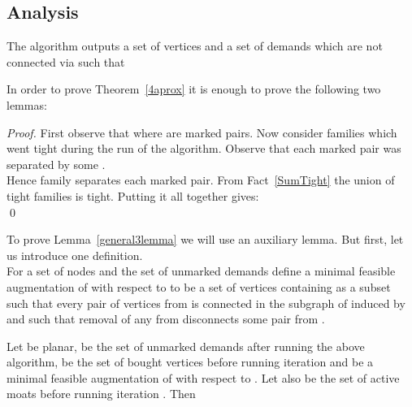 \subsection{Analysis}
\begin{theorem}
\label{4aprox}
The algorithm outputs a set of vertices  and a set of demands  which are not connected via  such that

\end{theorem}
In order to prove Theorem~\ref{4aprox} it is enough to prove the following two lemmas:
\begin{lemma}
\label{pc1lemma}

\end{lemma}
\begin{proof}
First observe that  where  are marked pairs. Now consider families  which went tight during the run of the algorithm. Observe that each marked pair was separated by some .\\
Hence family  separates each marked pair.
From Fact~\ref{SumTight} the union of tight families is tight. Putting it all together gives:\\
 \qed
\end{proof}

\begin{lemma}
\label{general3lemma}

\end{lemma}
To prove Lemma~\ref{general3lemma} we will use an auxiliary lemma. But first, let us introduce one definition.\\
For a set of nodes  and the set of unmarked demands  define a minimal feasible augmentation  of  with respect to  to be a set of vertices  containing  as a subset such that every pair of vertices from  is connected in the subgraph of  induced by  and such that removal of any  from  disconnects some pair from .

\begin{lemma}
\label{Carsten3lemma}
Let  be planar,  be the set of unmarked demands after running the above algorithm,  be the set of bought vertices before running iteration  and  be a minimal feasible augmentation of  with respect to . Let also  be the set of active moats before running iteration . Then\\

\end{lemma}

